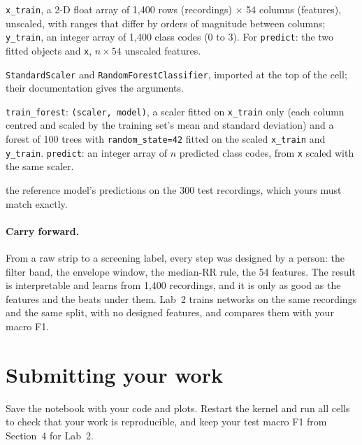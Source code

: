 \documentclass[12pt,article,oneside,linkcolour=blue]{oxengthesis}
\begin{document}
\begin{tcolorbox}[breakable, title=Specification: \texttt{train\_forest(x\_train, y\_train)} and \texttt{predict(scaler, model, x)}, colback=white, colframe=black!60]
\begin{description}[leftmargin=*, itemsep=2pt, font=\bfseries]
  \item[Given] \texttt{x\_train}, a 2-D float array of 1,400 rows (recordings) $\times$ 54 columns (features), unscaled, with ranges that differ by orders of magnitude between columns; \texttt{y\_train}, an integer array of 1,400 class codes (0 to 3). For \texttt{predict}: the two fitted objects and \texttt{x}, $n \times 54$ unscaled features.
  \item[You may use] \texttt{StandardScaler} and \texttt{RandomForestClassifier}, imported at the top of the cell; their documentation gives the arguments.
  \item[Return] \texttt{train\_forest}: \texttt{(scaler, model)}, a scaler fitted on \texttt{x\_train} only (each column centred and scaled by the training set's mean and standard deviation) and a forest of 100 trees with \texttt{random\_state=42} fitted on the scaled \texttt{x\_train} and \texttt{y\_train}. \texttt{predict}: an integer array of $n$ predicted class codes, from \texttt{x} scaled with the same scaler.
  \item[Checked by] the reference model's predictions on the 300 test recordings, which yours must match exactly.
\end{description}
\end{tcolorbox}

\paragraph{Carry forward.} From a raw strip to a screening label, every step was designed by a
person: the filter band, the envelope window, the median-RR rule, the 54 features. The result
is interpretable and learns from 1,400 recordings, and it is only as good as the features and
the beats under them. Lab~2 trains networks on the same recordings and the same split, with
no designed features, and compares them with your macro F1.


\section*{Submitting your work}
Save the notebook with your code and plots. Restart the kernel and run all cells
to check that your work is reproducible, and keep your test macro F1 from Section~4 for Lab~2.
\end{document}
